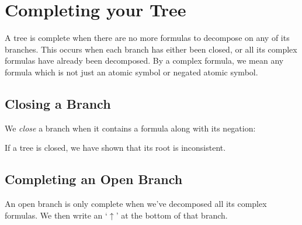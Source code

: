 \documentclass[PHIL101-Textbook.tex]{subfiles}
\begin{document}
\section{Completing your Tree} 

A tree is complete when there are no more formulas to decompose on any of its branches. This occurs when each branch has either been closed, or all its complex formulas have already been decomposed. By a complex formula, we mean any formula which is not just an atomic symbol or negated atomic symbol.

\subsection{Closing a Branch}

We \emph{close} a branch when it contains a formula along with its negation: 


If a tree is closed, we have shown that its root is inconsistent.



\subsection{Completing an Open Branch}
\label{sec.TFL.tree.completion}
An open branch is only complete when we've decomposed all its complex formulas. We then write an `$\uparrow$' at the bottom of that branch.



\end{document}
